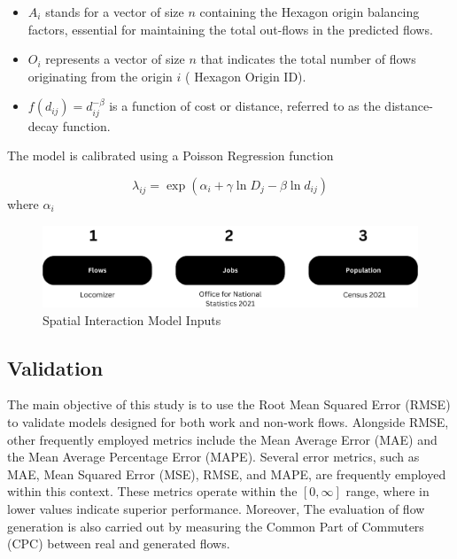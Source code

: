 \begin{itemize}
    \item $A_i$ stands for a vector of size $n$ containing the Hexagon origin balancing factors, essential for maintaining the total out-flows in the predicted flows.
    \item $O_i$  represents a vector of size $n$ that indicates the total number of flows originating from the origin $i$ ( Hexagon Origin ID).
    \item $f(d_{ij})=d_{ij}^{-\beta}$  is a function of cost or distance, referred to as the distance-decay function.
\end{itemize}

The model is calibrated using a Poisson Regression function

\begin{equation} \label{eq:4} \tag{4}
\lambda_{ij} = \exp (\alpha_i + \gamma \ln D_j - \beta \ln d_{ij})
\end{equation}
where $\alpha_i$

\begin{figure}[H]
        \centering
        \includegraphics[width=14cm]{Images/SIM_fig.png}
        \caption{Spatial Interaction Model Inputs}
        \label{fig: SIM_input}
    \end{figure}


\subsection{Validation}

The main objective of this study is to use the Root Mean Squared Error (RMSE) to validate models designed for both work and non-work flows. Alongside RMSE, other frequently employed metrics include the Mean Average Error (MAE) and the Mean Average Percentage Error (MAPE). Several error metrics, such as MAE, Mean Squared Error (MSE), RMSE, and MAPE, are frequently employed within this context. These metrics operate within the $[0, \infty ]$ range, where in lower values indicate superior performance. Moreover, The evaluation of flow generation is also carried out by measuring the Common Part of Commuters (CPC) between real and generated flows\citep{lucaSurveyDeepLearning2021}.

